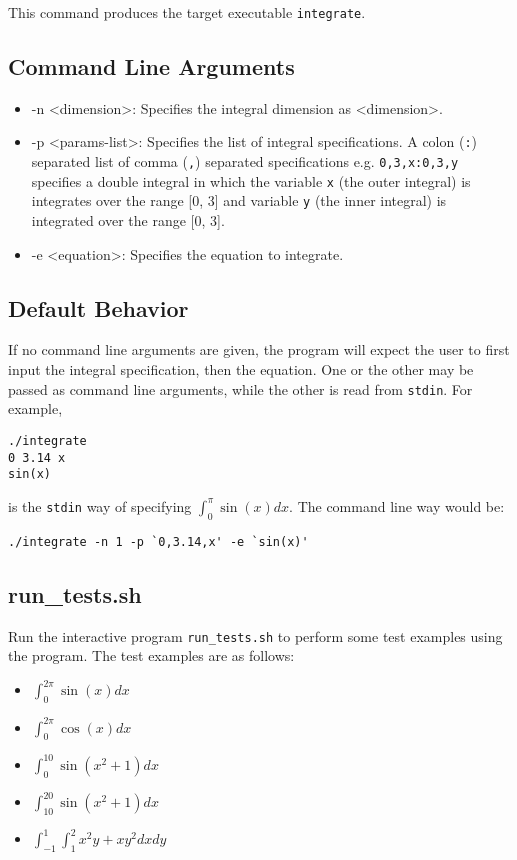 \documentclass[11pt]{article}
\begin{document}
\noindent
This command produces the target executable \texttt{integrate}.

\subsection{Command Line Arguments}
\label{sec:org9fe7278}
\begin{itemize}
\item -n <dimension>: Specifies the integral dimension as <dimension>.
\item -p <params-list>: Specifies the list of integral
specifications. A colon (\texttt{:}) separated list of comma (\texttt{,})
separated specifications e.g. \texttt{0,3,x:0,3,y} specifies a double
integral in which the variable \texttt{x} (the outer integral) is
integrates over the range [0, 3] and variable \texttt{y} (the inner
integral) is integrated over the range [0, 3].
\item -e <equation>: Specifies the equation to integrate.
\end{itemize}

\subsection{Default Behavior}
\label{sec:orgbd57abb}
If no command line arguments are given, the program will expect the
user to first input the integral specification, then the
equation. One or the other may be passed as command line arguments,
while the other is read from \texttt{stdin}. For example,
\begin{verbatim}
./integrate 
0 3.14 x
sin(x)
\end{verbatim}
is the \texttt{stdin} way of specifying \(\int_0^\pi \sin(x) dx\). The
command line way would be:
\begin{verbatim}
./integrate -n 1 -p `0,3.14,x' -e `sin(x)'
\end{verbatim}

\subsection{run\_tests.sh}
\label{sec:org17cef09}
Run the interactive program \texttt{run\_tests.sh} to perform some test
examples using the program. The test examples are as follows:
\begin{itemize}
\item \(\displaystyle{\int_0^{2\pi} \sin(x) dx}\)
\item \(\displaystyle{\int_0^{2\pi} \cos(x) dx}\)
\item \(\displaystyle{\int_0^{10} \sin(x^2 + 1) dx}\)
\item \(\displaystyle{\int_{10}^{20} \sin(x^2 + 1) dx}\)
\item \(\displaystyle{\int_{-1}^{1} \int_1^2 x^2y + xy^2 dx dy}\)
\end{itemize}
\end{document}
